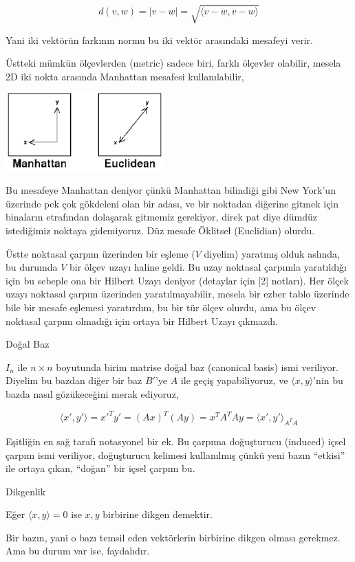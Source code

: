 \documentclass[12pt,fleqn]{article}\usepackage{../../common}
\begin{document}
$$ d(v,w) = |v - w| = \sqrt {\langle v-w, v-w \rangle }  $$

Yani iki vektörün farkının normu bu iki vektör arasındaki mesafeyi verir.

Üstteki mümkün ölçevlerden (metric) sadece biri, farklı ölçevler olabilir,
mesela 2D iki nokta arasında Manhattan mesafesi kullanılabilir, 

\includegraphics[height=3.0cm]{manhattan.png}

Bu mesafeye Manhattan deniyor çünkü Manhattan bilindiği gibi New York'un
üzerinde pek çok gökdeleni olan bir adası, ve bir noktadan diğerine gitmek
için binaların etrafından dolaşarak gitmemiz gerekiyor, direk pat diye
dümdüz istediğimiz noktaya gidemiyoruz. Düz mesafe Öklitsel (Euclidian)
olurdu. 

Üstte noktasal çarpım üzerinden bir eşleme ($V$ diyelim) yaratmış olduk
aslında, bu durumda $V$ bir ölçev uzayı haline geldi. Bu uzay noktasal
çarpımla yaratıldığı için bu sebeple ona bir Hilbert Uzayı deniyor
(detaylar için [2] notları). Her ölçek uzayı noktasal çarpım üzerinden
yaratılmayabilir, mesela bir ezber tablo üzerinde bile bir mesafe eşlemesi
yaratırdım, bu bir tür ölçev olurdu, ama bu ölçev noktasal çarpım olmadığı
için ortaya bir Hilbert Uzayı çıkmazdı.

Doğal Baz

$I_n$ ile $n \times n$ boyutunda birim matrise doğal baz (canonical basis)
ismi veriliyor. Diyelim bu bazdan diğer bir baz $B'$'ye $A$ ile geçiş
yapabiliyoruz, ve $\langle x,y \rangle$'nin bu bazda nasıl gözükeceğini
merak ediyoruz,

$$ \langle x',y' \rangle = x'^Ty' = 
(Ax)^T (Ay) = x^TA^TAy = {\langle x',y' \rangle}_{A^T A}
 $$

Eşitliğin en sağ tarafı notasyonel bir ek. Bu çarpıma doğuşturucu
(induced) içsel çarpım ismi veriliyor, doğuşturucu kelimesi kullanılmış
çünkü yeni bazın ``etkisi'' ile ortaya çıkan, ``doğan'' bir içsel çarpım
bu. 

Dikgenlik

Eğer $\langle x,y \rangle = 0$ ise $x,y$ birbirine dikgen demektir. 

Bir bazın, yani o bazı temsil eden vektörlerin birbirine dikgen olması
gerekmez. Ama bu durum var ise, faydalıdır.
\end{document}
